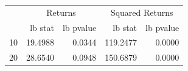 \begin{table}[htbp]
\centering
\begin{tabular}{lrrrr}
\toprule
 & \multicolumn{2}{c}{Returns} & \multicolumn{2}{c}{Squared Returns} \\
 & lb stat & lb pvalue & lb stat & lb pvalue \\
\midrule
10 & 19.4988 & 0.0344 & 119.2477 & 0.0000 \\
20 & 28.6540 & 0.0948 & 150.6879 & 0.0000 \\
\bottomrule
\end{tabular}
\label{tab:ljung_box}
\end{table}
